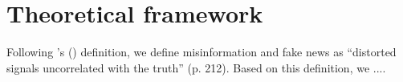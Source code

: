 \documentclass[man, 12pt, a4paper]{apa6}
\begin{document}
\section{Theoretical framework}

Following \citeauthor{allcott2017social}'s (\citeyear{allcott2017social}) definition, we define misinformation and fake news as \enquote{distorted signals uncorrelated with the truth} (p. 212). Based on this definition, we ....




\printbibliography
\end{document}
